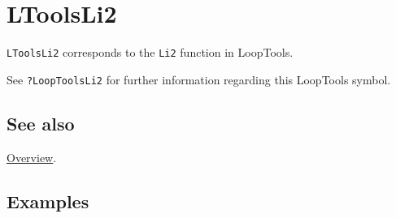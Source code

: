 \documentclass[../FeynHelpersManual.tex]{subfiles}
\begin{document}
\hypertarget{ltoolsli2}{
\section{LToolsLi2}\label{ltoolsli2}}

\texttt{LToolsLi2} corresponds to the \texttt{Li2} function in
LoopTools.

See \texttt{?LoopTools\textasciigrave Li2} for further information
regarding this LoopTools symbol.

\subsection{See also}

\hyperlink{toc}{Overview}.

\subsection{Examples}
\end{document}
